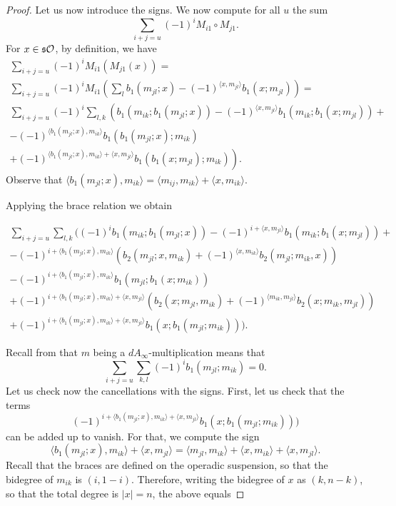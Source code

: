 \documentclass[Thesis.tex]{subfiles}
\begin{document}
\begin{proof}
Let us now introduce the signs. We now compute for all $u$ the sum%
\[\sum_{i+j=u} (-1)^iM_{i1}\circ M_{j1}.\]
For $x\in\mathfrak{s}{\mathcal O}$, by definition, we have
\begin{align*}
\sum_{i+j=u}(-1)^iM_{i1}(M_{j1}(x))=&\\
\sum_{i+j=u}(-1)^iM_{i1}\left(\sum_l b_1(m_{jl};x)-(-1)^{\langle x,m_{jl}\rangle}b_1(x;m_{jl})\right)=&\\
\sum_{i+j=u}(-1)^i\sum_{l,k}\left(b_1(m_{ik}; b_1(m_{jl};x))-(-1)^{\langle x,m_{jl}\rangle}b_1(m_{ik};b_1(x;m_{jl}))+\right.&\\
-(-1)^{\langle b_1(m_{jl};x),m_{ik}\rangle} b_1(b_1(m_{jl};x);m_{ik})&\\
\left.+(-1)^{\langle b_1(m_{jl};x),m_{ik}\rangle+\langle x,m_{jl}\rangle}b_1(b_1(x;m_{jl});m_{ik})\right).&
\end{align*}
Observe that $\langle b_1(m_{jl};x),m_{ik}\rangle=\langle m_{ij},m_{ik}\rangle+\langle x,m_{ik}\rangle$.

Applying the brace relation we obtain

\begin{align}\label{twistedequation}
\sum_{i+j=u}\sum_{l,k}((-1)^ib_1(m_{ik}; b_1(m_{jl};x))-(-1)^{i+\langle x,m_{jl}\rangle}b_1(m_{ik};b_1(x;m_{jl}))+\nonumber\\
 -(-1)^{i+\langle b_1(m_{jl};x),m_{ik}\rangle}(b_2(m_{jl};x,m_{ik})+(-1)^{\langle x,m_{ik}\rangle}b_2(m_{jl};m_{ik},x))\nonumber\\
 -(-1)^{i+\langle b_1(m_{jl};x),m_{ik}\rangle}b_1(m_{jl};b_1(x;m_{ik}))\nonumber\\
+(-1)^{i+\langle b_1(m_{jl};x),m_{ik}\rangle+\langle x,m_{jl}\rangle}(b_2(x;m_{jl},m_{ik})+(-1)^{\langle m_{ik},m_{jl}\rangle}b_2(x;m_{ik},m_{jl}))\nonumber\\
+(-1)^{i+\langle b_1(m_{jl};x),m_{ik}\rangle+\langle x,m_{jl}\rangle}b_1(x;b_1(m_{jl};m_{ik}))).
\end{align}

Recall from  that $m$ being a $dA_\infty$-multiplication means that \[\sum_{i+j=u}\sum_{k,l}(-1)^ib_1(m_{jl};m_{ik})=0.\] %
Let us check now the cancellations with the signs. First, let us check that the terms 
\[(-1)^{i+\langle b_1(m_{jl};x),m_{ik}\rangle+\langle x,m_{jl}\rangle}b_1(x;b_1(m_{jl};m_{ik})))\]
can be added up to vanish. For that, we compute the sign \[\langle b_1(m_{jl};x),m_{ik}\rangle+\langle x,m_{jl}\rangle=\langle m_{jl},m_{ik}\rangle+\langle x,m_{ik}\rangle+\langle x,m_{jl}\rangle.\]
Recall that the braces are defined on the operadic suspension, so that the bidegree of $m_{ik}$ is $(i,1-i)$. Therefore, writing the bidegree of $x$ as $(k,n-k)$, so that the total degree is $|x|=n$, the above equals 


\end{proof}
\end{document}
